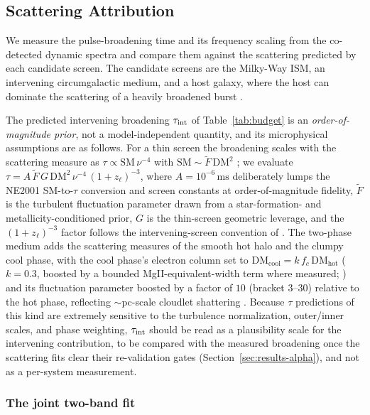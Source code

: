 \subsection{Scattering Attribution}
\label{sec:scattering}

We measure the pulse-broadening time and its frequency scaling from the
co-detected dynamic spectra and compare them against the scattering predicted
by each candidate screen. The candidate screens are the Milky-Way ISM, an
intervening circumgalactic medium, and a host galaxy, where the host can
dominate the scattering of a heavily broadened burst \citep{Ocker2022}.

The predicted intervening broadening $\tau_{\rm int}$ of
Table~\ref{tab:budget} is an \emph{order-of-magnitude prior}, not a
model-independent quantity, and its microphysical assumptions are as
follows. For a thin screen the broadening scales with the scattering measure
as $\tau \propto \mathrm{SM}\,\nu^{-4}$ with
$\mathrm{SM}\sim\tilde{F}\,\mathrm{DM}^2$
\citep{CordesLazio2002, Cordes2016, Ocker2021}; we evaluate
$\tau = A\,\tilde{F}\,G\,\mathrm{DM}^{2}\,\nu^{-4}\,(1+z_{\ell})^{-3}$, where
$A = 10^{-6}\,\mathrm{ms}$ deliberately lumps the NE2001 SM-to-$\tau$
conversion and screen constants at order-of-magnitude fidelity, $\tilde{F}$
is the turbulent fluctuation parameter drawn from a star-formation- and
metallicity-conditioned prior, $G$ is the thin-screen geometric leverage,
and the $(1+z_{\ell})^{-3}$ factor follows the intervening-screen convention
of \citet{MacquartKoay2013}. The two-phase medium adds the scattering
measures of the smooth hot halo and the clumpy cool phase, with the cool
phase's electron column set to $\mathrm{DM_{cool}} = k\,f_c\,\mathrm{DM_{hot}}$
($k=0.3$, boosted by a bounded MgII-equivalent-width term where measured;
\citealt{Werk2014, LanMo2018}) and its fluctuation parameter boosted by a
factor of $10$ (bracket $3$--$30$) relative to the hot phase, reflecting
$\sim$pc-scale cloudlet shattering \citep{McCourt2018, VedanthamPhinney2019,
Ocker2021}. Because $\tau$ predictions of this kind are extremely sensitive
to the turbulence normalization, outer/inner scales, and phase weighting,
$\tau_{\rm int}$ should be read as a plausibility scale for the intervening
contribution, to be compared with the measured broadening once the scattering
fits clear their re-validation gates (Section~\ref{sec:results-alpha}), and
not as a per-system measurement.

\subsubsection{The joint two-band fit}
\label{sec:jointfit}
\label{sec:beta-scattering-methods}

